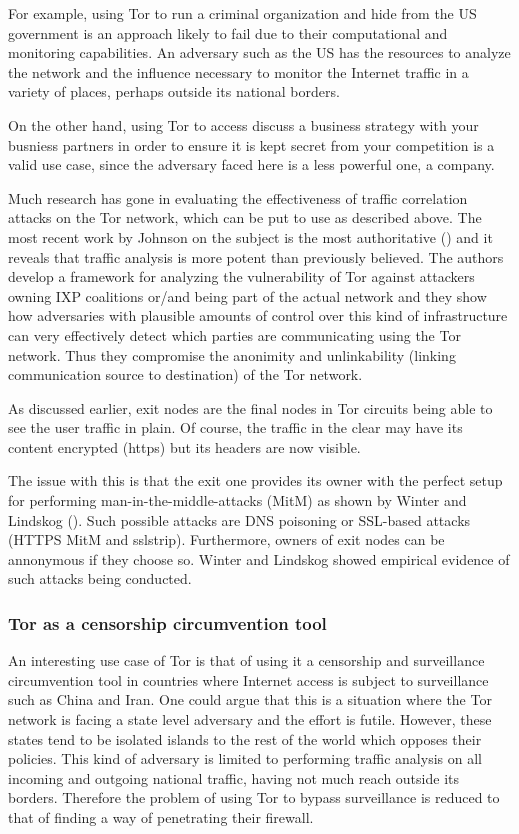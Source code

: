 \documentclass[11pt]{article} %
\begin{document}
For example, using Tor to run a criminal organization and hide from the US government is an approach likely to fail due to their computational and monitoring capabilities. An adversary such as the US has the resources to analyze the network and the influence necessary to monitor the Internet traffic in a variety of places, perhaps outside its national borders.

On the other hand, using Tor to access discuss a business strategy with your busniess partners in order to ensure it is kept secret from your competition is a valid use case, since the adversary faced here is a less powerful one, a company.

Much research has gone in evaluating the effectiveness of traffic correlation attacks on the Tor network, which can be put to use as described above. The most recent work by Johnson on the subject is the most authoritative (\citep*{captainJohnson}) and it reveals that traffic analysis is more potent than previously believed. The authors develop a framework for analyzing the vulnerability of Tor against attackers owning IXP coalitions or/and being part of the actual network and they show how adversaries with plausible amounts of control over this kind of infrastructure can very effectively detect which parties are communicating using the Tor network. Thus they compromise the anonimity and unlinkability (linking communication source to destination) of the Tor network.


As discussed earlier, exit nodes are the final nodes in Tor circuits being able to see the user traffic in plain. Of course, the traffic in the clear may have its content encrypted (https) but its headers are now visible.

The issue with this is that the exit one provides its owner with the perfect setup for performing man-in-the-middle-attacks (MitM) as shown by Winter and Lindskog (\citep*{spoiledOnions}). Such possible attacks are DNS poisoning or SSL-based attacks (HTTPS MitM and sslstrip). Furthermore, owners of exit nodes can be annonymous if they choose so. Winter and Lindskog showed empirical evidence of such attacks being conducted.

\subsubsection{Tor as a censorship circumvention tool}

An interesting use case of Tor is that of using it a censorship and surveillance circumvention tool in countries where Internet access is subject to surveillance such as China and Iran. One could argue that this is a situation where the Tor network is facing a state level adversary and the effort is futile. However, these states tend to be isolated islands to the rest of the world which opposes their policies. This kind of adversary is limited to performing traffic analysis on all incoming and outgoing national traffic, having not much reach outside its borders. Therefore the problem of using Tor to bypass surveillance is reduced to that of finding a way of penetrating their firewall.
\end{document}
